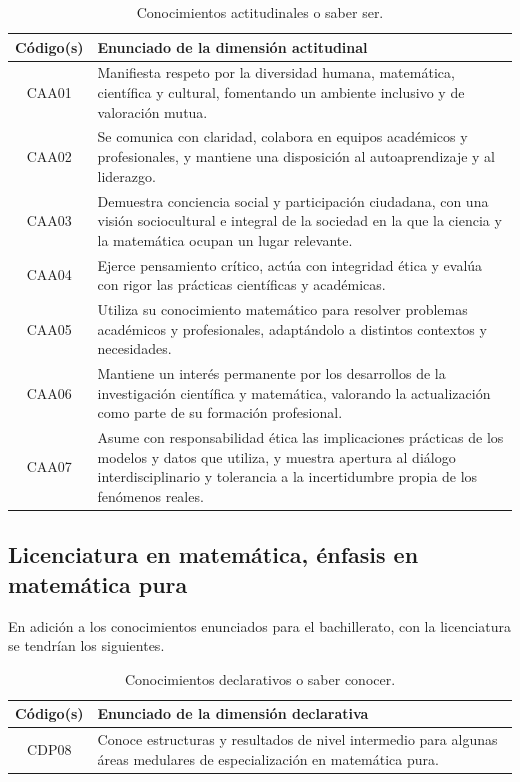 \documentclass[11pt,a4paper]{article}
\begin{document}
\begin{table}[H]
\centering
\renewcommand{\arraystretch}{1.3}
\begin{tabular}{|c|p{9cm}|}
\hline
\cellcolor[HTML]{00C0F3}\textbf{Código(s)} & \cellcolor[HTML]{00C0F3}\textbf{Enunciado de la dimensión actitudinal} \\
\hline
CAA01 & Manifiesta respeto por la diversidad humana, matemática, científica y cultural, fomentando un ambiente inclusivo y de valoración mutua. \\
\hline
CAA02 & Se comunica con claridad, colabora en equipos académicos y profesionales, y mantiene una disposición al autoaprendizaje y al liderazgo.\\
\hline
CAA03 & Demuestra conciencia social y participación ciudadana, con una visión sociocultural e integral de la sociedad en la que la ciencia y la matemática ocupan un lugar relevante.\\
\hline
CAA04 & Ejerce pensamiento crítico, actúa con integridad ética y evalúa con rigor las prácticas científicas y académicas.\\
\hline
CAA05 & Utiliza su conocimiento matemático para resolver problemas académicos y profesionales, adaptándolo a distintos contextos y necesidades.\\
\hline
CAA06 & Mantiene un interés permanente por los desarrollos de la investigación científica y matemática, valorando la actualización como parte de su formación profesional.\\
\hline
CAA07 & Asume con responsabilidad ética las implicaciones prácticas de los modelos y datos que utiliza, y muestra apertura al diálogo interdisciplinario y tolerancia a la incertidumbre propia de los fenómenos reales.\\
\hline
\end{tabular}
\caption{Conocimientos actitudinales o saber ser.}
\end{table}


\subsection*{Licenciatura en matemática, énfasis en matemática pura}


En adición a los conocimientos enunciados para el bachillerato, con la licenciatura se tendrían los siguientes.

\begin{table}[H]
\centering
\renewcommand{\arraystretch}{1.3}
\begin{tabular}{|c|p{9cm}|}
\hline
\cellcolor[HTML]{00C0F3}\textbf{Código(s)} & \cellcolor[HTML]{00C0F3}\textbf{Enunciado de la dimensión declarativa} \\
\hline
CDP08 & Conoce estructuras y resultados de nivel intermedio para algunas áreas medulares de especialización en matemática pura. 
\\
\hline
\end{tabular}
\caption{Conocimientos declarativos o saber conocer.}
\end{table}
\end{document}
